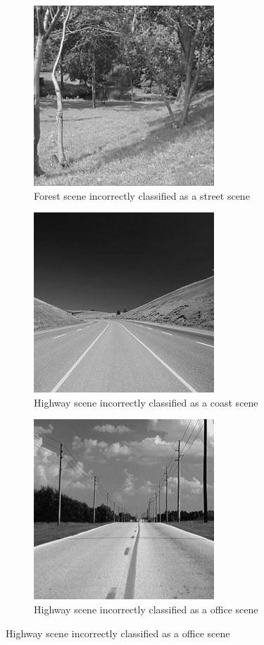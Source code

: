 \begin{homeworkProblem}
\begin{figure}[H]
\begin{subfigure}{0.5\textwidth}
  \end{subfigure}%
  \begin{subfigure}{0.5\textwidth}
    \centering
    \caption{Forest scene incorrectly classified as a street scene}
    \includegraphics[width=.5\linewidth]{./images/1_street.jpg}
  \end{subfigure}
  \begin{subfigure}{0.5\textwidth}
    \centering
    \caption{Highway scene incorrectly classified as a coast scene}
    \includegraphics[width=.5\linewidth]{./images/2_coas.jpg}
  \end{subfigure}%
  \begin{subfigure}{0.5\textwidth}
    \centering
    \caption{Highway scene incorrectly classified as a office scene}
    \includegraphics[width=.5\linewidth]{./images/2_offi.jpg}
  \end{subfigure}
\end{figure}


\end{homeworkProblem}
